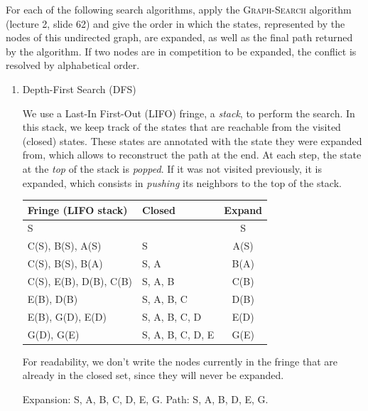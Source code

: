 \documentclass[11pt, a4paper]{article}
\begin{document}
For each of the following search algorithms, apply the \textsc{Graph-Search} algorithm (lecture 2, slide 62) and give the order in which the states, represented by the nodes of this undirected graph, are expanded, as well as the final path returned by the algorithm. If two nodes are in competition to be expanded, the conflict is resolved by alphabetical order.

\begin{enumerate}
    \item Depth-First Search (DFS)

    \begin{solution}
        We use a Last-In First-Out (LIFO) fringe, \ie{} a \emph{stack}, to perform the search. In this stack, we keep track of the states that are reachable from the visited (closed) states. These states are annotated with the state they were expanded from, which allows to reconstruct the path at the end. At each step, the state at the \emph{top} of the stack is \emph{popped}. If it was not visited previously, it is expanded, which consists in \emph{pushing} its neighbors to the top of the stack.

        \begin{table}[H]
            \centering
            \begin{tabular}{l|l|c}
                \toprule
                Fringe (LIFO stack) & Closed & Expand \\
                \midrule
                S & & S \\
                C(S), B(S), A(S) & S & A(S) \\
                C(S), B(S), B(A) & S, A & B(A) \\
                C(S), E(B), D(B), C(B) & S, A, B & C(B) \\
                E(B), D(B) & S, A, B, C & D(B) \\
                E(B), G(D), E(D) & S, A, B, C, D & E(D) \\
                G(D), G(E) & S, A, B, C, D, E & G(E) \\
                \bottomrule
            \end{tabular}
        \end{table}

        For readability, we don't write the nodes currently in the fringe that are already in the closed set, since they will never be expanded.

        Expansion: S, A, B, C, D, E, G. Path: S, A, B, D, E, G.
    \end{solution}


\end{enumerate}
\end{document}
